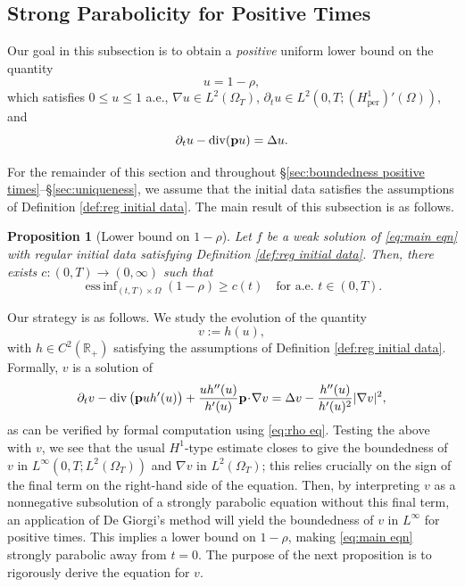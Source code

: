 \documentclass[11pt,a4paper,reqno]{amsart}
\newtheorem{prop}{Proposition}[section]
\theoremstyle{remark}
\theoremstyle{definition}
\numberwithin{equation}{section}
\newcommand{\per}{\mathrm{per}}
\DeclareMathOperator{\dv}{div}
\DeclareMathOperator{\essinf}{ess \, inf}
\newcommand{\p}{{\bf p}}
\begin{document}
\subsection{Strong Parabolicity for Positive Times}\label{subsec:strong parab}



Our goal in this subsection is to obtain a \emph{positive} uniform lower bound on the quantity 
\begin{equation*}
    u = 1- \rho, 
\end{equation*}
which satisfies $0 \leq u \leq 1$ a.e., $\nabla u \in L^2(\Omega_T)$, $\partial_t u \in L^2(0,T;(H^1_\per)'(\Omega))$, and 
\begin{equation}\label{eq: eqn 1-rho}
    \partial_t u -   \dv(\p u) = \Delta u.  
\end{equation}

For the remainder of this section and throughout \S \ref{sec:boundedness positive times}--\S \ref{sec:uniqueness}, we assume that the initial data satisfies the assumptions of Definition \ref{def:reg initial data}. The main result of this subsection is as follows. 

\begin{prop}[Lower bound on $1\!-\!\rho$]\label{prop:lower bound 1-rho}
    Let $f$ be a weak solution of \eqref{eq:main eqn} with regular initial data satisfying Definition \ref{def:reg initial data}. Then, there exists $c:(0,T) \to (0,\infty)$ such that 
    \begin{equation*}
    \essinf_{(t,T)\times\Omega} (1-\rho) \geq c(t) \quad \text{for a.e.~} t \in (0,T). 
\end{equation*}
\end{prop}

Our strategy is as follows. We study the evolution of the quantity 
\begin{equation*}
       v := h(u), 
    \end{equation*}
with $h \in C^2(\mathbb{R}_+)$ satisfying the assumptions of Definition \ref{def:reg initial data}. Formally, $v$ is a solution of 
\begin{equation*}
    \partial_t v  - \dv\big( \p u h'(u) \big) + \frac{u h''(u)}{h'(u)} \p \! \cdot \! \nabla v  = \Delta v - \frac{h''(u)}{h'(u)^2}{|\nabla v|^2}, 
\end{equation*}
as can be verified by formal computation using \eqref{eq:rho eq}. Testing the above with $v$, we see that the usual $H^1$-type estimate closes to give the boundedness of $v$ in $L^\infty(0,T;L^2(\Omega_T))$ and $\nabla v$ in $L^2(\Omega_T)$; this relies crucially on the sign of the final term on the right-hand side of the equation. Then, by interpreting $v$ as a nonnegative subsolution of a strongly parabolic equation without this final term, an application of De Giorgi's method will yield the boundedness of $v$ in $L^\infty$ for positive times. This implies a lower bound on $1-\rho$, making \eqref{eq:main eqn} strongly parabolic away from $t=0$. The purpose of the next proposition is to rigorously derive the equation for $v$. 
\end{document}

